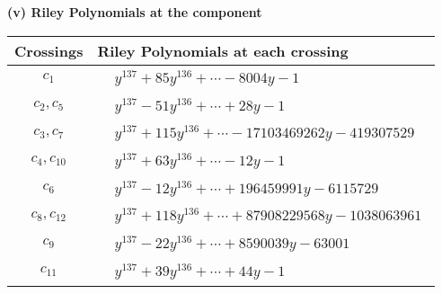 \documentclass[1p]{elsarticle_modified}
\theoremstyle{definition}
\begin{document}
\newpage\renewcommand{\arraystretch}{1}
\flushleft \textbf{(v) Riley Polynomials at the component}\newline \\
\begin{tabular}{m{50pt}|m{274pt}}
Crossings & \hspace{64pt}Riley Polynomials at each crossing \\
\hline $$\begin{aligned}c_{1}\end{aligned}$$&$\begin{aligned}
&y^{137}+85 y^{136}+\cdots-8004 y-1
\end{aligned}$\\
\hline $$\begin{aligned}c_{2},c_{5}\end{aligned}$$&$\begin{aligned}
&y^{137}-51 y^{136}+\cdots+28 y-1
\end{aligned}$\\
\hline $$\begin{aligned}c_{3},c_{7}\end{aligned}$$&$\begin{aligned}
&y^{137}+115 y^{136}+\cdots-17103469262 y-419307529
\end{aligned}$\\
\hline $$\begin{aligned}c_{4},c_{10}\end{aligned}$$&$\begin{aligned}
&y^{137}+63 y^{136}+\cdots-12 y-1
\end{aligned}$\\
\hline $$\begin{aligned}c_{6}\end{aligned}$$&$\begin{aligned}
&y^{137}-12 y^{136}+\cdots+196459991 y-6115729
\end{aligned}$\\
\hline $$\begin{aligned}c_{8},c_{12}\end{aligned}$$&$\begin{aligned}
&y^{137}+118 y^{136}+\cdots+87908229568 y-1038063961
\end{aligned}$\\
\hline $$\begin{aligned}c_{9}\end{aligned}$$&$\begin{aligned}
&y^{137}-22 y^{136}+\cdots+8590039 y-63001
\end{aligned}$\\
\hline $$\begin{aligned}c_{11}\end{aligned}$$&$\begin{aligned}
&y^{137}+39 y^{136}+\cdots+44 y-1
\end{aligned}$\\
\hline
\end{tabular}\\~\\
\end{document}

